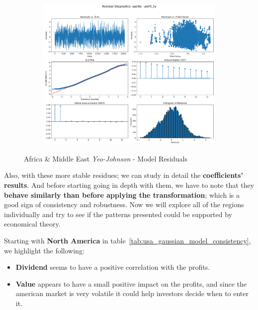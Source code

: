 \documentclass[11pt,english,a4paper,hidelinks]{book}
\begin{document}
\begin{figure}[H]
\begin{subfigure}[b]{0.32\textwidth}
    \end{subfigure}
    \hfill
    \begin{subfigure}[b]{0.32\textwidth}
        \centering
        \includegraphics[width=\textwidth]{images/code/models/linear_regression/first_model/AF/quality_profit_5y_residuals - Gaussian.png}
    \end{subfigure}
    \caption{Africa \& Middle East \textit{Yeo-Johnson} - Model Residuals}
    \label{fig:linear_regression_AF_residues_gaussian}
\end{figure}


\noindent Also, with these more stable residues; we can study in detail the \textbf{coefficients' results}. And before starting going in depth with them, we have to note that they \textbf{behave similarly than before applying the transformation}; which is a good sign of consistency and robustness. Now we will explore all of the regions individually and try to see if the patterns presented could be supported by economical theory.

\vspace{0.5cm}
\noindent Starting with \textbf{North America} in table~\ref{tab:usa_gaussian_model_consistency}, we highlight the following:
\begin{itemize}
    \item \textbf{Dividend} seems to have a positive correlation with the profits.
    \item \textbf{Value} appears to have a small positive impact on the profits, and since the american market is very volatile it could help investors decide when to enter it.
\end{itemize}
\end{document}
